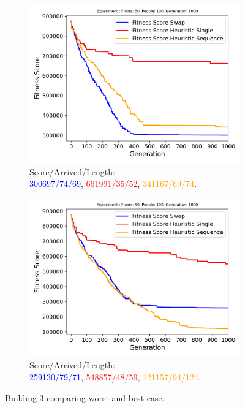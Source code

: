 \begin{figure}[ht]
	\centering
	\begin{subfigure}[b]{0.49\linewidth}
		\centering
		\includegraphics[width=\linewidth]{results/Building3/Mutation_0.1/Floors__50,_People__100,_Generation__1000_4_worst.png}
		\captionsetup{justification=centering,font=tiny}
		\caption{Score/Arrived/Length:\\\textcolor{blue}{300697/74/69}, \textcolor{red}{661991/35/52}, \textcolor{orange}{341167/69/74}.}
		\label{fig:Building3 worst}
	\end{subfigure}
	\hfill
	\begin{subfigure}[b]{0.49\linewidth}
		\centering
		\includegraphics[width=\linewidth]{results/Building3/Mutation_0.1/Floors__50,_People__100,_Generation__1000_1_best.png}
		\captionsetup{justification=centering,font=tiny}
		\caption{Score/Arrived/Length:\\\textcolor{blue}{259130/79/71}, \textcolor{red}{548857/48/59}, \textcolor{orange}{121157/94/124}.}
		\label{fig:Building3 best}
	\end{subfigure}
	\captionsetup{font=scriptsize}
	\caption{Building 3 comparing worst and best case.}
	\label{fig:Building3 results}
\end{figure}
\newpage
